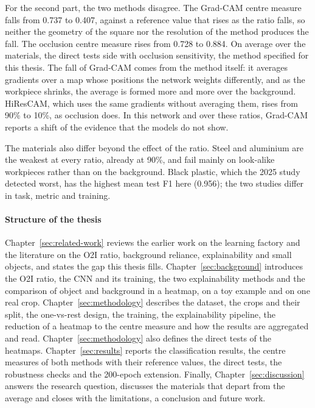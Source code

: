 For the second part, the two methods disagree. The Grad-CAM centre measure falls from
0.737 to 0.407, against a reference value that rises as the ratio falls, so neither the
geometry of the square nor the resolution of the method produces the fall. The occlusion
centre measure rises from 0.728 to 0.884. On average over the materials, the direct tests
side with occlusion sensitivity, the method specified for this thesis. The fall of Grad-CAM comes from the
method itself: it averages gradients over a map whose positions the network weights
differently, and as the workpiece shrinks, the average is formed more and more over the
background. HiResCAM, which uses the same gradients without averaging them, rises from
90\% to 10\%, as occlusion does. In this network and over these ratios, Grad-CAM reports a shift of
the evidence that the models do not show.

The materials also differ beyond the effect of the ratio. Steel and aluminium are the
weakest at every ratio, already at 90\%, and fail mainly on look-alike workpieces rather
than on the background. Black plastic, which the 2025 study detected worst, has the
highest mean test F1 here (0.956); the two studies differ in task, metric and training.

\paragraph{Structure of the thesis}
Chapter~\ref{sec:related-work} reviews the earlier work on the learning factory and the
literature on the O2I ratio, background reliance, explainability and small objects, and
states the gap this thesis fills. Chapter~\ref{sec:background} introduces the O2I ratio,
the CNN and its training, the two explainability methods and the comparison of object
and background in a heatmap, on a toy example and on one real crop.
Chapter~\ref{sec:methodology} describes the dataset, the crops and their split, the one-vs-rest
design, the training, the explainability pipeline, the reduction of a heatmap to the
centre measure and how the results are aggregated and read.
Chapter~\ref{sec:methodology} also defines the direct tests of the heatmaps.
Chapter~\ref{sec:results} reports the classification results, the centre measures of
both methods with their reference values, the direct tests, the robustness checks and
the 200-epoch extension. Finally, Chapter~\ref{sec:discussion} answers the research question,
discusses the materials that depart from the average and closes with the limitations,
a conclusion and future work.
